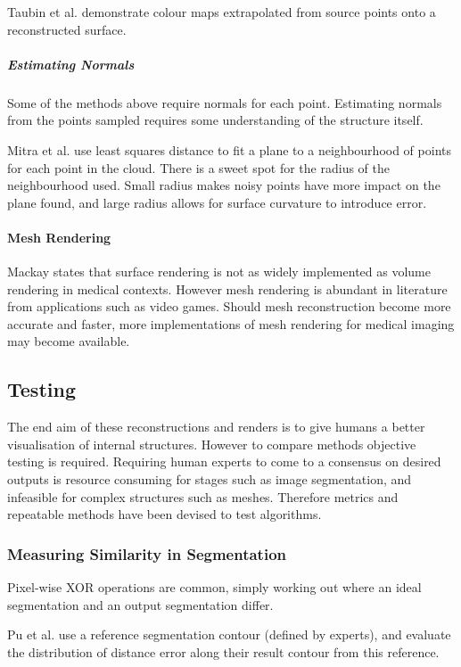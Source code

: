 \documentclass[11p, titlepage]{article}
\begin{document}
Taubin et al. \cite{taubin2012smooth} demonstrate colour maps extrapolated from source points onto a reconstructed surface.

\subparagraph{Estimating Normals}

Some of the methods above require normals for each point. Estimating normals from the points sampled requires some understanding of the structure itself.

Mitra et al. \cite{mitra2003estimating} use least squares distance to fit a plane to a neighbourhood of points for each point in the cloud. There is a sweet spot for the radius of the neighbourhood used. Small radius makes noisy points have more impact on the plane found, and large radius allows for surface curvature to introduce error. 

\paragraph{Mesh Rendering}

Mackay \cite{mackay2019robust} states that surface rendering is not as widely implemented as volume rendering in medical contexts. However mesh rendering is abundant in literature from applications such as video games. Should mesh reconstruction become more accurate and faster, more implementations of mesh rendering for medical imaging may become available.

\subsection{Testing}

The end aim of these reconstructions and renders is to give humans a better visualisation of internal structures. However to compare methods objective testing is required. Requiring human experts to come to a consensus on desired outputs is resource consuming for stages such as image segmentation, and infeasible for complex structures such as meshes. Therefore metrics and repeatable methods have been devised to test algorithms.

\subsubsection{Measuring Similarity in Segmentation}

Pixel-wise XOR operations are common, simply working out where an ideal segmentation and an output segmentation differ.

Pu et al. \cite{pu2008adaptive} use a reference segmentation contour (defined by experts), and evaluate the distribution of distance error along their result contour from this reference. 
\end{document}
